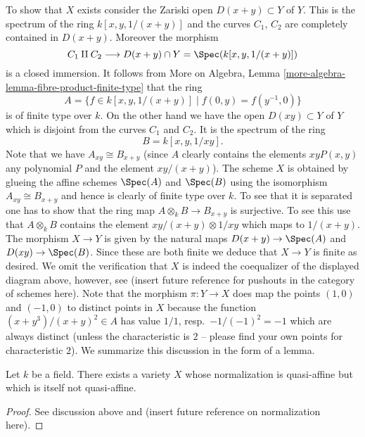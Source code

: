 \medskip\noindent
To show that $X$ exists consider the Zariski open
$D(x + y) \subset Y$ of $Y$. This is the spectrum
of the ring
$k[x, y, 1/(x + y)]$
and the curves $C_1$, $C_2$ are completely contained in
$D(x + y)$. Moreover the morphism
$$
C_1 \amalg C_2
\longrightarrow
D(x + y) \cap Y = \Spec(k[x, y, 1/(x + y)])
$$
is a closed immersion. It follows from
More on Algebra, Lemma \ref{more-algebra-lemma-fibre-product-finite-type}
that the ring
$$
A =
\{f \in k[x, y, 1/(x + y)] \mid f(0, y) = f(y^{-1}, 0)\}
$$
is of finite type over $k$. On the other hand we have the open
$D(xy) \subset Y$ of $Y$ which is disjoint from the curves $C_1$
and $C_2$. It is the spectrum of the ring
$$
B = k[x, y, 1/xy].
$$
Note that we have $A_{xy} \cong B_{x + y}$ (since $A$ clearly contains
the elements $xyP(x, y)$ any polynomial $P$ and the element $xy/(x + y)$).
The scheme $X$ is obtained by glueing the affine schemes
$\Spec(A)$ and $\Spec(B)$ using the isomorphism
$A_{xy} \cong B_{x + y}$ and hence is clearly of finite type over
$k$. To see that it is separated one has to show that the
ring map $A \otimes_k B \to B_{x + y}$ is surjective. To see
this use that $A \otimes_k B$ contains the element
$xy/(x + y) \otimes 1/xy$ which maps to $1/(x + y)$.
The morphism $X \to Y$ is given by the natural maps
$D(x + y) \to \Spec(A)$ and $D(xy) \to \Spec(B)$.
Since these are both finite we deduce that $X \to Y$ is finite
as desired. We omit the verification that $X$ is indeed the
coequalizer of the displayed diagram above, however, see
(insert future reference for pushouts in the category of schemes
here). Note that the morphism $\pi : Y \to X$ does
map the points  $(1, 0)$
and $(-1, 0)$ to distinct points in $X$ because the
function $(x + y^3)/(x + y)^2 \in A$ has value
$1/1$, resp.\ $-1/(-1)^2 = -1$ which are always distinct
(unless the characteristic is $2$ -- please find your own points
for characteristic $2$). We summarize this discussion in the
form of a lemma.

\begin{lemma}
\label{lemma-quasi-affine-normalization-not-quasi-affine}
Let $k$ be a field.
There exists a variety $X$ whose normalization is quasi-affine but
which is itself not quasi-affine.
\end{lemma}

\begin{proof}
See discussion above and (insert future reference on normalization here).
\end{proof}






